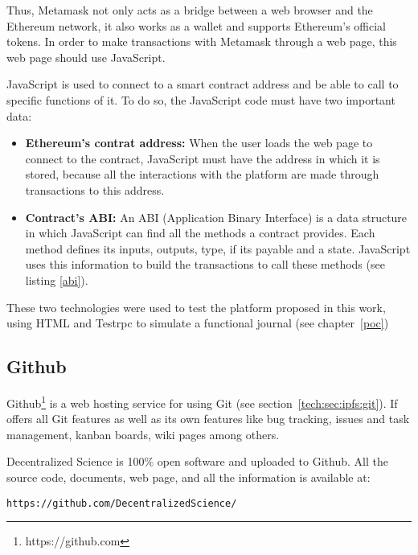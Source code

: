 Thus, Metamask not only acts as a bridge between a web browser and the Ethereum
network, it also works as a wallet and supports Ethereum's official tokens. In
order to make transactions with Metamask through a web page, this web page
should use JavaScript.

JavaScript is used to connect to a smart contract address and be able to call to
specific functions of it. To do so, the JavaScript code must have two important
data:

\begin{itemize}
\item \textbf{Ethereum's contrat address:} When the user loads the web page to
  connect to the contract, JavaScript must have the address in which it is
  stored, because all the interactions with the platform are made through
  transactions to this address.
\item \textbf{Contract's ABI:} An ABI (Application Binary Interface) is a data
  structure in which JavaScript can find all the methods a contract provides.
  Each method defines its inputs, outputs, type, if its payable and a state.
  JavaScript uses this information to build the transactions to call these
  methods (see listing \ref{abi}).

\end{itemize}

These two technologies were used to test the platform proposed in this work,
using HTML and Testrpc to simulate a functional journal (see chapter~\ref{poc})





\subsection{Github}
\label{sec:github}

Github\footnote{https://github.com} is a web hosting service for  using
Git (see section~\ref{tech:sec:ipfs:git}). If offers all Git features as well as
its own features like bug tracking, issues and task management, kanban boards,
wiki pages among others.

Decentralized Science is 100\% open software and uploaded to Github. All the
source code, documents, web page, and all the information is available at:

\begin{lstlisting}[frame=single]
  https://github.com/DecentralizedScience/
\end{lstlisting}
